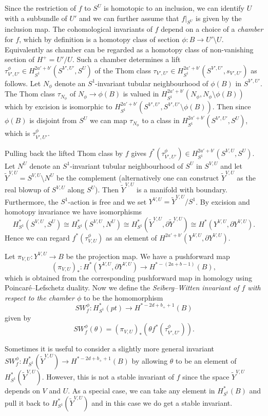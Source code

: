 \documentclass{amsart}
\theoremstyle{definition}
\theoremstyle{remark}
\numberwithin{equation}{section}
\begin{document}
Since the restriction of $f$ to $S^U$ is homotopic to an inclusion, we can identify $U$ with a subbundle of $U'$ and we can further assume that $f|_{S^U}$ is given by the inclusion map. The cohomological invariants of $f$ depend on a choice of a {\em chamber} for $f$, which by definition is a homotopy class of section $\phi : B \to U' \setminus U$. Equivalently as chamber can be regarded as a homotopy class of non-vanishing section of $H^+ = U'/U$. Such a chamber determines a lift $\tau^\phi_{V',U'} \in H^{2a'+b'}_{S^1}( S^{V',U'} , S^{U} )$ of the Thom class $\tau_{V',U'} \in H_{S^1}^{2a'+b'}( S^{V',U'} , s_{V',U'})$ as follows. Let $N_\phi$ denote an $S^1$-invariant tubular neighbourhood of $\phi(B)$ in $S^{V',U'}$. The Thom class $\tau_{N_\phi}$ of $N_\phi \to \phi(B)$ is valued in $H^{2a'+b'}_{S^1}( N_\phi , N_\phi \setminus \phi(B))$ which by excision is isomorphic to $H^{2a'+b'}_{S^1}( S^{V',U'} , S^{V',U'} \setminus \phi(B))$. Then since $\phi(B)$ is disjoint from $S^{U}$ we can map $\tau_{N_\phi}$ to a class in $H^{2a'+b'}_{S^1}( S^{V',U'} , S^U)$, which is $\tau^\phi_{V',U'}$. 

Pulling back the lifted Thom class by $f$ gives $f^*(\tau^\phi_{V',U'}) \in H^{2a'+b'}_{S^1}(S^{V,U} , S^U)$. Let $N^U$ denote an $S^1$-invariant tubular neighbourhood of $S^U$ in $S^{V,U}$ and let $\widetilde{Y}^{V,U} = S^{V,U} \setminus N^U$ be the complement (alternatively one can construct $\widetilde{Y}^{V,U}$ as the real blowup of $S^{V,U}$ along $S^U$). Then $\widetilde{Y}^{V,U}$ is a manifold with boundary. Furthermore, the $S^1$-action is free and we set $Y^{V,U} = \widetilde{Y}^{V,U}/S^1$. By excision and homotopy invariance we have isomorphisms
\[
H^*_{S^1}( S^{V,U} , S^U) \cong H^*_{S^1}( S^{V,U} , N^U) \cong H^*_{S^1}( \widetilde{Y}^{V,U} , \partial \widetilde{Y}^{V,U}) \cong H^*( Y^{V,U} , \partial Y^{V,U}).
\]
Hence we can regard $f^*( \tau^\phi_{V,U})$ as an element of $H^{2a'+b'}( Y^{V,U} , \partial Y^{V,U} )$.

Let $\pi_{V,U} : Y^{V,U} \to B$ be the projection map. We have a pushforward map
\[
(\pi_{V,U})_* : H^*( Y^{V,U} , \partial Y^{V,U} ) \to H^{*-(2a+b-1)}(B),
\]
which is obtained from the corresponding pushforward map in homology using Poincar\'e--Lefschetz duality. Now we define the {\em Seiberg--Witten invariant of $f$ with respect to the chamber $\phi$} to be the homomorphism
\[
SW^\phi_f : H^*_{S^1}(pt) \to H^{*-2d+b_++1}(B)
\]
given by
\[
SW^\phi_f(\theta) = (\pi_{V,U})_*(  \theta  f^*(\tau^\phi_{V',U'})).
\]

Sometimes it is useful to consider a slightly more general invariant $SW^\phi_f : H^*_{S^1}( \widetilde{Y}^{V,U} ) \to H^{*-2d+b_++1}(B)$ by allowing $\theta$ to be an element of $H^*_{S^1}( \widetilde{Y}^{V,U})$. However, this is not a stable invariant of $f$ since the space $\widetilde{Y}^{V,U}$ depends on $V$ and $U$. As a special case, we can take any element in $H^*_{S^1}(B)$ and pull it back to $H^*_{S^1}(\widetilde{Y}^{V,U})$ and in this case we do get a stable invariant.
\end{document}
